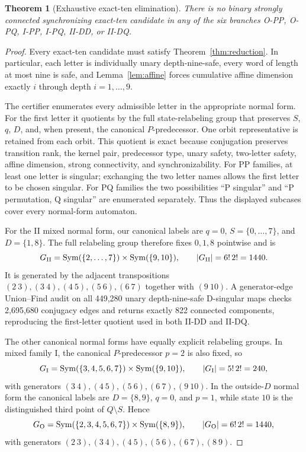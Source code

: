 \documentclass[11pt]{article}
\newtheorem{theorem}{Theorem}
\theoremstyle{definition}
\theoremstyle{remark}
\begin{document}
\begin{theorem}[Exhaustive exact-ten elimination]\label{thm:certifier}
There is no binary strongly connected synchronizing exact-ten candidate in any of the six branches O-PP, O-PQ, I-PP, I-PQ, II-DD, or II-DQ.
\end{theorem}
\begin{proof}
Every exact-ten candidate must satisfy Theorem~\ref{thm:reduction}. In particular, each letter is individually unary depth-nine-safe, every word of length at most nine is safe, and Lemma~\ref{lem:affine} forces cumulative affine dimension exactly $i$ through depth $i=1,\ldots,9$.

The certifier enumerates every admissible letter in the appropriate normal form. For the first letter it quotients by the full state-relabeling group that preserves $S$, $q$, $D$, and, when present, the canonical $P$-predecessor. One orbit representative is retained from each orbit. This quotient is exact because conjugation preserves transition rank, the kernel pair, predecessor type, unary safety, two-letter safety, affine dimension, strong connectivity, and synchronizability. For PP families, at least one letter is singular; exchanging the two letter names allows the first letter to be chosen singular. For PQ families the two possibilities ``P singular'' and ``P permutation, Q singular'' are enumerated separately. Thus the displayed subcases cover every normal-form automaton.

For the II mixed normal form, our canonical labels are $q=0$, $S=\{0,\ldots,7\}$, and $D=\{1,8\}$. The full relabeling group therefore fixes $0,1,8$ pointwise and is
\[
G_{\rm II}=\operatorname{Sym}(\{2,\ldots,7\})\times \operatorname{Sym}(\{9,10\}),
\qquad |G_{\rm II}|=6!\,2!=1440.
\]
It is generated by the adjacent transpositions $(2\ 3),(3\ 4),(4\ 5),(5\ 6),(6\ 7)$ together with $(9\ 10)$. A generator-edge Union--Find audit on all 449,280 unary depth-nine-safe D-singular maps checks 2,695,680 conjugacy edges and returns exactly 822 connected components, reproducing the first-letter quotient used in both II-DD and II-DQ.

The other canonical normal forms have equally explicit relabeling groups. In mixed family I, the canonical $P$-predecessor $p=2$ is also fixed, so
\[
G_{\rm I}=\operatorname{Sym}(\{3,4,5,6,7\})\times \operatorname{Sym}(\{9,10\}),
\qquad |G_{\rm I}|=5!\,2!=240,
\]
with generators $(3\ 4),(4\ 5),(5\ 6),(6\ 7),(9\ 10)$. In the outside-$D$ normal form the canonical labels are $D=\{8,9\}$, $q=0$, and $p=1$, while state $10$ is the distinguished third point of $Q\setminus S$. Hence
\[
G_{\rm O}=\operatorname{Sym}(\{2,3,4,5,6,7\})\times \operatorname{Sym}(\{8,9\}),
\qquad |G_{\rm O}|=6!\,2!=1440,
\]
with generators $(2\ 3),(3\ 4),(4\ 5),(5\ 6),(6\ 7),(8\ 9)$.


\end{proof}
\end{document}
